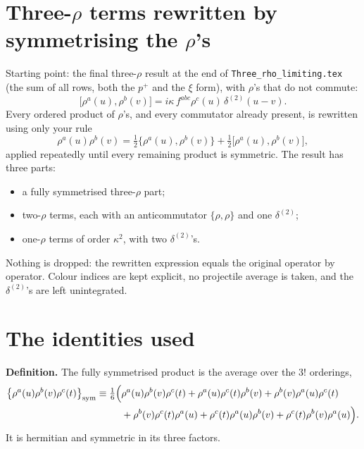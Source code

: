 \documentclass[10pt]{article}
\numberwithin{equation}{section}
\begin{document}
\section*{Three-$\rho$ terms rewritten by symmetrising the $\rho$'s}
\noindent Starting point: the final three-$\rho$ result at the end of \texttt{Three\_rho\_limiting.tex} (the sum of all rows, both the $p^{+}$ and the $\xi$ form), with $\rho$'s that do not commute:
\begin{equation}
\big[\rho^{a}(u),\rho^{b}(v)\big]=i\kappa\,f^{abc}\rho^{c}(u)\,\delta^{(2)}(u-v).
\end{equation}
Every ordered product of $\rho$'s, and every commutator already present, is rewritten using only your rule
\begin{equation}
\rho^{a}(u)\rho^{b}(v)=\tfrac12\big\{\rho^{a}(u),\rho^{b}(v)\big\}+\tfrac12\big[\rho^{a}(u),\rho^{b}(v)\big],\label{eq:rule}
\end{equation}
applied repeatedly until every remaining product is symmetric. The result has three parts:
\begin{itemize}
\item a fully symmetrised three-$\rho$ part;
\item two-$\rho$ terms, each with an anticommutator $\{\rho,\rho\}$ and one $\delta^{(2)}$;
\item one-$\rho$ terms of order $\kappa^{2}$, with two $\delta^{(2)}$'s.
\end{itemize}
Nothing is dropped: the rewritten expression equals the original operator by operator. Colour indices are kept explicit, no projectile average is taken, and the $\delta^{(2)}$'s are left unintegrated.

\section{The identities used}
\textbf{Definition.} The fully symmetrised product is the average over the $3!$ orderings,
\begin{align}
\big\{\rho^{a}(u)\rho^{b}(v)\rho^{c}(t)\big\}_{\rm sym}\equiv\tfrac16\Big(&\rho^{a}(u)\rho^{b}(v)\rho^{c}(t)+\rho^{a}(u)\rho^{c}(t)\rho^{b}(v)+\rho^{b}(v)\rho^{a}(u)\rho^{c}(t)\notag\\
&+\rho^{b}(v)\rho^{c}(t)\rho^{a}(u)+\rho^{c}(t)\rho^{a}(u)\rho^{b}(v)+\rho^{c}(t)\rho^{b}(v)\rho^{a}(u)\Big).
\end{align}
It is hermitian and symmetric in its three factors.
\end{document}
